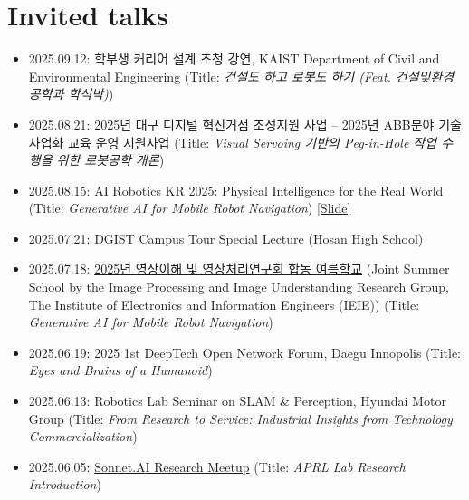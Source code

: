 \section{Invited talks}
\begin{itemize}[label=$\cdot$]
    \item 2025.09.12: \textsf{학부생 커리어 설계 초청 강연}, KAIST Department of Civil and Environmental Engineering  
    \hfill (Title: \textit{\textsf{건설도 하고 로봇도 하기 (Feat. 건설및환경공학과 학석박)}})
    
    \item 2025.08.21: \textsf{2025년 대구 디지털 혁신거점 조성지원 사업 -- 2025년 ABB분야 기술사업화 교육 운영 지원사업}   
    \hfill (Title: \textit{\textsf{Visual Servoing 기반의 Peg-in-Hole 작업 수행을 위한 로봇공학 개론}})
    
    \item 2025.08.15: AI Robotics KR 2025: Physical Intelligence for the Real World  
        \hfill (Title: \textit{Generative AI for Mobile Robot Navigation}) 
        \href{https://www.dropbox.com/scl/fi/mejiev0huoryn9gzls86j/20250815-Giseop-Kim-Generative-AI-for-Mobile-Robot-Navigation.pptx?rlkey=p76u5j7jikvp57nez8fktb9we&dl=0}{[Slide]}
            
    \item 2025.07.21: DGIST Campus Tour Special Lecture (Hosan High School)   
    
    \item 2025.07.18: \href{https://www.theieie.org/events/?part=03&c_id=949}{\textsf{2025년 영상이해 및 영상처리연구회 합동 여름학교}} (Joint Summer School by the Image Processing and Image Understanding Research Group, The Institute of Electronics and Information Engineers (IEIE))  
        \hfill (Title: \textit{Generative AI for Mobile Robot Navigation})
    
    \item 2025.06.19: 2025 1st DeepTech Open Network Forum, Daegu Innopolis  
    \hfill (Title: \textit{Eyes and Brains of a Humanoid})
    
    \item 2025.06.13: Robotics Lab Seminar on SLAM \& Perception, Hyundai Motor Group  
    \hfill (Title: \textit{From Research to Service: Industrial Insights from Technology Commercialization})
    
    \item 2025.06.05: \href{https://sonnet.ai}{Sonnet.AI Research Meetup}  
    \hfill (Title: \textit{APRL Lab Research Introduction})
        

\end{itemize}
